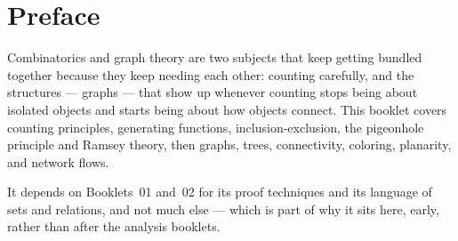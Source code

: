 \chapter*{Preface}

Combinatorics and graph theory are two subjects that keep
getting bundled together because they keep needing each other: counting
carefully, and the structures --- graphs --- that show up whenever
counting stops being about isolated objects and starts being about how
objects connect. This booklet covers counting principles, generating
functions, inclusion-exclusion, the pigeonhole principle and Ramsey
theory, then graphs, trees, connectivity, coloring, planarity, and
network flows.

It depends on Booklets~01 and~02 for its proof techniques and its
language of sets and relations, and not much else --- which is part of
why it sits here, early, rather than after the analysis booklets.
